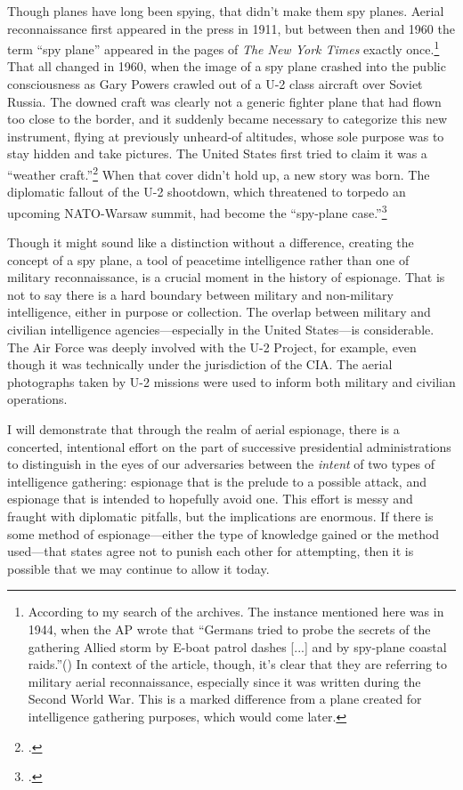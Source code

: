\documentclass{report}
\begin{document}
\begin{refsegment}
Though planes have long been spying, that didn't make them spy planes. Aerial reconnaissance first appeared in the press in 1911, but between then and 1960 the term ``spy plane'' appeared in the pages of \emph{The New York Times} exactly once.\footnote{According to my search of the archives. The instance mentioned here was in 1944, when the AP wrote that ``Germans tried to probe the secrets of the gathering Allied storm by E-boat patrol dashes [...] and by spy-plane coastal raids.''(\cite{the_associated_press_britons_1944}) In context of the article, though, it's clear that they are referring to military aerial reconnaissance, especially since it was written during the Second World War. This is a marked difference from a plane created for intelligence gathering purposes, which would come later.} That all changed in 1960, when the image of a spy plane crashed into the public consciousness as Gary Powers crawled out of a U-2 class aircraft over Soviet Russia. The downed craft was clearly not a generic fighter plane that had flown too close to the border, and it suddenly became necessary to categorize this new instrument, flying at previously unheard-of altitudes, whose sole purpose was to stay hidden and take pictures. The United States first tried to claim it was a ``weather craft.''\footcite{caruthers_soviet_1960} When that cover didn't hold up, a new story was born. The diplomatic fallout of the U-2 shootdown, which threatened to torpedo an upcoming NATO-Warsaw summit, had become the ``spy-plane case.''\footcite[This is the second time that ``spy plane'' as a term of art appeared in \emph{The New York Times}. There would be many more.]{reston_allies_1960}

Though it might sound like a distinction without a difference, creating the concept of a spy plane, a tool of peacetime intelligence rather than one of military reconnaissance, is a crucial moment in the history of espionage. That is not to say there is a hard boundary between military and non-military intelligence, either in purpose or collection. The overlap between military and civilian intelligence agencies---especially in the United States---is considerable. The Air Force was deeply involved with the U-2 Project, for example, even though it was technically under the jurisdiction of the CIA. The aerial photographs taken by U-2 missions were used to inform both military and civilian operations.

I will demonstrate that through the realm of aerial espionage, there is a concerted, intentional effort on the part of successive presidential administrations to distinguish in the eyes of our adversaries between the \emph{intent} of two types of intelligence gathering: espionage that is the prelude to a possible attack, and espionage that is intended to hopefully avoid one. This effort is messy and fraught with diplomatic pitfalls, but the implications are enormous. If there is some method of espionage---either the type of knowledge gained or the method used---that states agree not to punish each other for attempting, then it is possible that we may continue to allow it today.


\end{refsegment}
\end{document}
